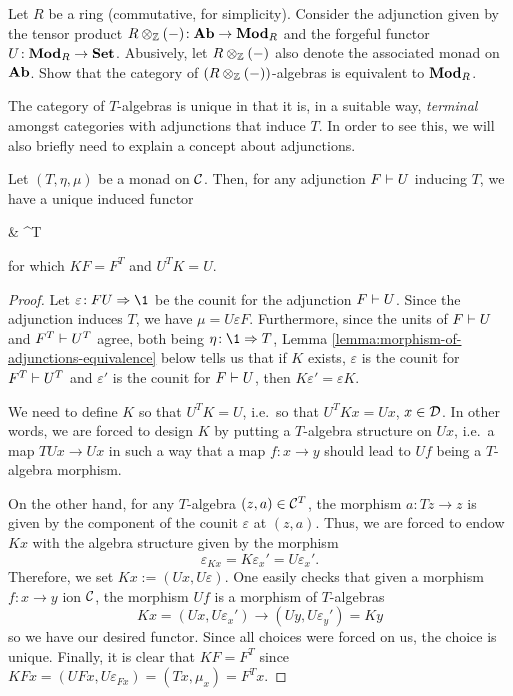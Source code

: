 \begin{exercise}
	Let \(R\) be a ring (commutative, for simplicity). Consider the adjunction given by the tensor product \(R\otimes_{\mathbb{Z}}(-)\!:\mathbf{Ab}\to\mathbf{Mod}_R\) and the forgeful functor \(U\!:\mathbf{Mod}_R\to\mathbf{Set}\).
	Abusively, let \(R\otimes_{\mathbb{Z}}(-)\) also denote the associated monad on \(\mathbf{Ab}\). Show that the category of \((R\otimes_{\mathbb{Z}}(-))\)-algebras is equivalent to \(\mathbf{Mod}_R\).
\end{exercise}

The category of \(T\)-algebras is unique in that it is, in a suitable way, \emph{terminal} amongst categories with adjunctions that induce \(T\). In order to see this, we will also briefly
need to explain a concept about adjunctions.
\begin{proposition}
	Let \((T,\eta,\mu)\) be a monad on \(\mathcal{C}\). Then, for any adjunction \(F\vdash U\) inducing \(T\), we have a unique induced functor
	\begin{diagram*}[column sep=huge, row sep=large]
		\calD\ar[r,dashed,"K"]\ar[d,bend left,"U",""{name=D,left}] & \calC^T\ar[dl,shift left, bend left=40, "U^T",""{name=B,above}] \\
		\calC\ar[u,bend left,"F",""{name=C,right}]\ar[ur,bend right=10,"F^T",""{name=A,right}]\ar[to=A,from=B,symbol=\vdash]\ar[to=C,from=D,symbol=\vdash]
	\end{diagram*}
	for which \(KF = F^T\) and \(U^T K = U\).
\end{proposition}
\begin{proof}
Let \(\varepsilon\!:FU\To\1\) be the counit for the adjunction \(F\vdash U\). Since the adjunction induces \(T\), we have \(\mu = U\varepsilon F\). Furthermore, since
the units of \(F\vdash U\) and \(F^T\vdash U^T\) agree, both being \(\eta\!:\1\To T\), Lemma \ref{lemma:morphism-of-adjunctions-equivalence} below tells us that if \(K\) exists,
\(\varepsilon\) is the counit for \(F^T\vdash U^T\) and \(\varepsilon'\) is the counit for \(F\vdash U\), then \(K\varepsilon' = \varepsilon K\).

We need to define \(K\) so that \(U^TK = U\), i.e.\ so that \(U^TKx = Ux\), \(x\in\mathcal{D}\). In other words, we are forced to design \(K\) by putting a \(T\)-algebra structure on \(Ux\), i.e.\ a map \(TUx \to Ux\)
in such a way that a map \(f\!:x\to y\) should lead to \(Uf\) being a \(T\)-algebra morphism.

On the other hand, for any \(T\)-algebra \((z,a)\in\mathcal{C}^T\), the morphism \(a\!:Tz\to z\) is given by the component of the counit \(\varepsilon\) at \((z,a)\). Thus, we are forced to endow \(Kx\) with the algebra
structure given by the morphism
\[ \varepsilon_{Kx} = K\varepsilon_x' = U\varepsilon_x'. \]
Therefore, we set \(Kx := (Ux,U\varepsilon)\). One easily checks that given a morphism \(f\!:x\to y\) ion \(\mathcal{C}\), the morphism \(Uf\) is a morphism of \(T\)-algebras
\[ Kx = (Ux,U\varepsilon_x')\to(Uy,U\varepsilon_y') = Ky \]
so we have our desired functor. Since all choices were forced on us, the choice is unique. Finally, it is clear that \(KF = F^T\)
since \(KFx = (UFx, U\varepsilon_{Fx}) = (Tx, \mu_x) = F^Tx\).
\end{proof}

